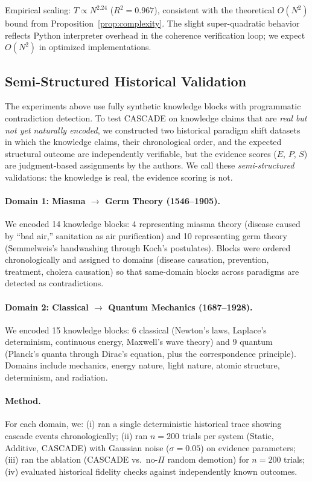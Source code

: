 \documentclass[11pt,a4paper]{article}
\theoremstyle{definition}
\newcommand{\tp}{\Pi}
\begin{document}
Empirical scaling: $T \propto N^{2.24}$ ($R^2 = 0.967$), consistent with the
theoretical $O(N^2)$ bound from Proposition~\ref{prop:complexity}. The slight
super-quadratic behavior reflects Python interpreter overhead in the coherence
verification loop; we expect $O(N^2)$ in optimized implementations.

\subsection{Semi-Structured Historical Validation}\label{sec:historical}

The experiments above use fully synthetic knowledge blocks with programmatic
contradiction detection. To test CASCADE on knowledge claims that are \emph{real but
not yet naturally encoded}, we constructed two historical paradigm shift datasets in
which the knowledge claims, their chronological order, and the expected structural
outcome are independently verifiable, but the evidence scores ($E$, $P$, $S$) are
judgment-based assignments by the authors. We call these \emph{semi-structured}
validations: the knowledge is real, the evidence scoring is not.

\paragraph{Domain 1: Miasma $\to$ Germ Theory (1546--1905).}
We encoded 14 knowledge blocks: 4 representing miasma theory (disease caused by ``bad
air,'' sanitation as air purification) and 10 representing germ theory (Semmelweis's
handwashing through Koch's postulates). Blocks were ordered chronologically and
assigned to domains (disease causation, prevention, treatment, cholera causation) so
that same-domain blocks across paradigms are detected as contradictions.

\paragraph{Domain 2: Classical $\to$ Quantum Mechanics (1687--1928).}
We encoded 15 knowledge blocks: 6 classical (Newton's laws, Laplace's determinism,
continuous energy, Maxwell's wave theory) and 9 quantum (Planck's quanta through
Dirac's equation, plus the correspondence principle). Domains include mechanics,
energy nature, light nature, atomic structure, determinism, and radiation.

\paragraph{Method.} For each domain, we: (i) ran a single deterministic historical
trace showing cascade events chronologically; (ii) ran $n=200$ trials per system
(Static, Additive, CASCADE) with Gaussian noise ($\sigma = 0.05$) on evidence
parameters; (iii) ran the ablation (CASCADE vs.\ no-$\tp$ random demotion) for $n=200$
trials; (iv) evaluated historical fidelity checks against independently known outcomes.
\end{document}
